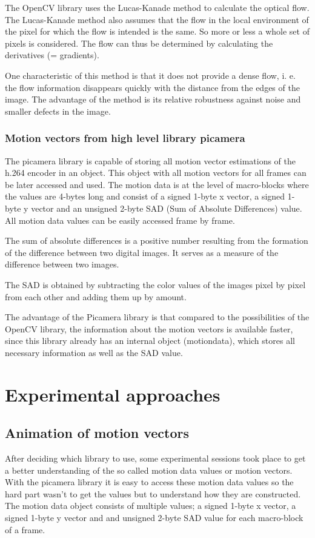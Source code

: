 \documentclass[12pt, a4paper]{report}
\begin{document}
    The OpenCV library uses the Lucas-Kanade method to calculate the optical flow. The Lucas-Kanade method also assumes that the flow in the local environment of the pixel for which the flow is intended is the same. So more or less a whole set of pixels is considered. The flow can thus be determined by calculating the derivatives (= gradients). 
    
    One characteristic of this method is that it does not provide a dense flow, i. e. the flow information disappears quickly with the distance from the edges of the image. The advantage of the method is its relative robustness against noise and smaller defects in the image.
    
    \subsection{Motion vectors from high level library picamera}
    The picamera library is capable of storing all motion vector estimations of the h.264 encoder in an object. This object with all motion vectors for all frames can be later accessed and used. The motion data is at the level of macro-blocks where the values are 4-bytes long and consist of a signed 1-byte x vector, a signed 1-byte y vector and an unsigned 2-byte SAD (Sum of Absolute Differences) value. All motion data values can be easily accessed frame by frame. \cite{ReadTheDocsPicamera}
    
    The sum of absolute differences is a positive number resulting from the formation of the difference between two digital images. It serves as a measure of the difference between two images.
    
    The SAD is obtained by subtracting the color values of the images pixel by pixel from each other and adding them up by amount. 
    
    The advantage of the Picamera library is that compared to the possibilities of the OpenCV library, the information about the motion vectors is available faster, since this library already has an internal object (motiondata), which stores all necessary information as well as the SAD value. 
    

    \chapter {Experimental approaches}

    \section{Animation of motion vectors}
    After deciding which library to use, some experimental sessions took place to get a better understanding of the so called motion data values or motion vectors. 
    With the picamera library it is easy to access these motion data values so the hard part wasn't to get the values but to understand how they are constructed. 
    The motion data object consists of multiple values; a signed 1-byte x vector, a signed 1-byte y vector and and unsigned 2-byte SAD value for each macro-block of a frame.
    
\end{document}

